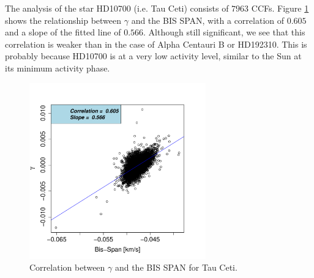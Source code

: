\documentclass[11pt, oneside]{article}
\begin{document}
The analysis of the star HD10700 (i.e. Tau Ceti) consists of $7963$ CCFs. Figure \ref{fig:Tau:corr.gamma} shows the relationship between $\gamma$ and the BIS SPAN, with a correlation of $0.605$ and a slope of the fitted line of $0.566$. Although still significant, we see that this correlation is weaker than in the case of Alpha Centauri B or HD192310. This is probably because HD10700 is at a very low activity level, similar to the Sun at its minimum activity phase.
%
\begin{figure}[htbp]
   \centering
\includegraphics[height = 3in]{HD10700_[2]gamma_vs_bisspan.pdf} 
   \caption{Correlation between $\gamma$ and the BIS SPAN for Tau Ceti.}
   \label{fig:Tau:corr.gamma}
\end{figure}
\end{document}

